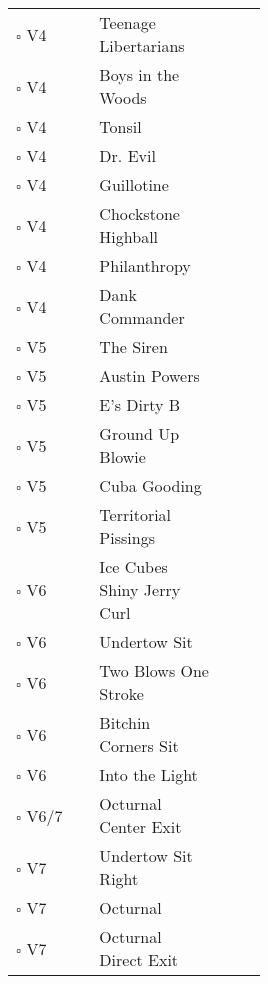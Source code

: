 \begin{center}
\begin{supertabular}{lp{0.5\linewidth}ll}
$\square$ V4&Teenage Libertarians &   & \pageref{rt:Teenage Libertarians} \\
$\square$ V4&Boys in the Woods &  & \pageref{rt:Boys in the Woods} \\
$\square$ V4&Tonsil &  & \pageref{rt:Tonsil} \\
$\square$ V4&Dr. Evil &  & \pageref{rt:Dr. Evil} \\
$\square$ V4&Guillotine &  & \pageref{rt:Guillotine} \\
$\square$ V4&Chockstone Highball && \pageref{rt:Chockstone Highball} \\
$\square$ V4&Philanthropy && \pageref{rt:Philanthropy} \\
$\square$ V4&Dank Commander && \pageref{rt:Dank Commander} \\
$\square$ V5&The Siren &   & \pageref{rt:The Siren} \\
$\square$ V5&Austin Powers &  & \pageref{rt:Austin Powers} \\
$\square$ V5&E's Dirty B &  & \pageref{rt:E's Dirty B} \\
$\square$ V5&Ground Up Blowie &  & \pageref{rt:Ground Up Blowie} \\
$\square$ V5&Cuba Gooding && \pageref{rt:Cuba Gooding} \\
$\square$ V5&Territorial Pissings && \pageref{rt:Territorial Pissings} \\
$\square$ V6&Ice Cubes Shiny Jerry Curl && \pageref{rt:Ice Cubes Shiny Jerry Curl} \\
$\square$ V6&Undertow Sit && \pageref{vr:Undertow Sit} \\
$\square$ V6&Two Blows One Stroke && \pageref{rt:Two Blows One Stroke} \\
$\square$ V6&Bitchin Corners Sit && \pageref{vr:Bitchin Corners Sit} \\
$\square$ V6&Into the Light && \pageref{rt:Into the Light} \\
$\square$ V6/7&Octurnal Center Exit &  & \pageref{vr:Octurnal Center Exit} \\
$\square$ V7&Undertow Sit Right &   & \pageref{vr:Undertow Sit Right} \\
$\square$ V7&Octurnal &   & \pageref{rt:Octurnal} \\
$\square$ V7&Octurnal Direct Exit &   & \pageref{vr:Octurnal Direct Exit} \\

\end{supertabular}
\end{center}
